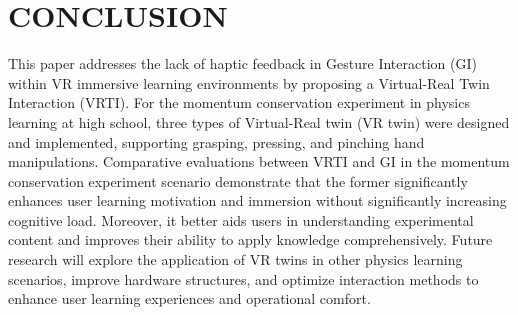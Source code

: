 \section{CONCLUSION}
This paper addresses the lack of haptic feedback in Gesture Interaction (GI) within VR immersive learning environments by proposing a Virtual-Real Twin Interaction (VRTI). For the momentum conservation experiment in physics learning at high school, three types of Virtual-Real twin (VR twin) were designed and implemented, supporting grasping, pressing, and pinching hand manipulations. Comparative evaluations between VRTI and GI in the momentum conservation experiment scenario demonstrate that the former significantly enhances user learning motivation and immersion without significantly increasing cognitive load. Moreover, it better aids users in understanding experimental content and improves their ability to apply knowledge comprehensively. Future research will explore the application of VR twins in other physics learning scenarios, improve hardware structures, and optimize interaction methods to enhance user learning experiences and operational comfort.